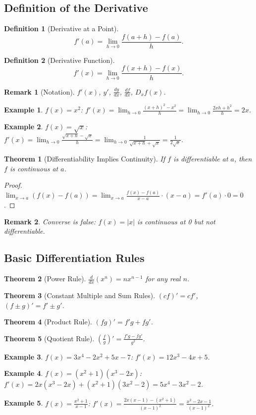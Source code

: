 \documentclass[11pt,a4paper]{article}
\newtheorem{example}{Example}
\newtheorem{theorem}{Theorem}
\newtheorem{definition}{Definition}
\newtheorem{remark}{Remark}
\begin{document}
\subsection{Definition of the Derivative}
\begin{definition}[Derivative at a Point]
\[
f'(a) = \lim_{h \to 0} \frac{f(a+h) - f(a)}{h}.
\]
\end{definition}
\begin{definition}[Derivative Function]
\[
f'(x) = \lim_{h \to 0} \frac{f(x+h) - f(x)}{h}.
\]
\end{definition}
\begin{remark}[Notation]
$f'(x)$, $y'$, $\frac{dy}{dx}$, $\frac{df}{dx}$, $D_x f(x)$.
\end{remark}
\begin{example}
$f(x) = x^2$: $f'(x) = \lim_{h \to 0} \frac{(x+h)^2 - x^2}{h} = \lim_{h \to 0} \frac{2xh + h^2}{h} = 2x$.
\end{example}
\begin{example}
$f(x) = \sqrt{x}$: $f'(x) = \lim_{h \to 0} \frac{\sqrt{x+h} - \sqrt{x}}{h} = \lim_{h \to 0} \frac{1}{\sqrt{x+h}+\sqrt{x}} = \frac{1}{2\sqrt{x}}$.
\end{example}
\begin{theorem}[Differentiability Implies Continuity]
If $f$ is differentiable at $a$, then $f$ is continuous at $a$.
\end{theorem}
\begin{proof}
$\lim_{x \to a} (f(x) - f(a)) = \lim_{x \to a} \frac{f(x)-f(a)}{x-a} \cdot (x-a) = f'(a) \cdot 0 = 0$.
\end{proof}
\begin{remark}
Converse is false: $f(x) = |x|$ is continuous at 0 but not differentiable.
\end{remark}
\subsection{Basic Differentiation Rules}
\begin{theorem}[Power Rule]
$\frac{d}{dx}(x^n) = nx^{n-1}$ for any real $n$.
\end{theorem}
\begin{theorem}[Constant Multiple and Sum Rules]
$(cf)' = cf'$, $(f \pm g)' = f' \pm g'$.
\end{theorem}
\begin{theorem}[Product Rule]
$(fg)' = f'g + fg'$.
\end{theorem}
\begin{theorem}[Quotient Rule]
$\left(\frac{f}{g}\right)' = \frac{f'g - fg'}{g^2}$.
\end{theorem}
\begin{example}
$f(x) = 3x^4 - 2x^2 + 5x - 7$: $f'(x) = 12x^3 - 4x + 5$.
\end{example}
\begin{example}
$f(x) = (x^2+1)(x^3-2x)$: $f'(x) = 2x(x^3-2x) + (x^2+1)(3x^2-2) = 5x^4 - 3x^2 - 2$.
\end{example}
\begin{example}
$f(x) = \frac{x^2+1}{x-1}$: $f'(x) = \frac{2x(x-1) - (x^2+1)}{(x-1)^2} = \frac{x^2-2x-1}{(x-1)^2}$.
\end{example}
\end{document}
